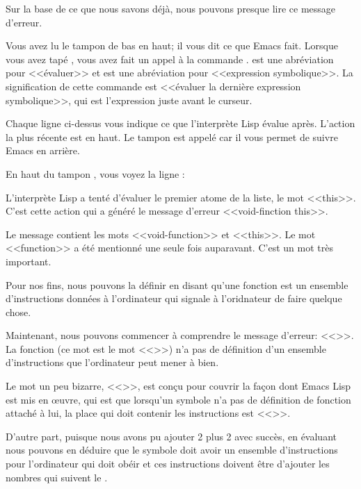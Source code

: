Sur la base de ce que nous savons déjà, nous pouvons presque lire ce
message d'erreur.

Vous avez lu le tampon  de bas en haut; il vous dit ce
que Emacs fait. Lorsque vous avez tapé , vous avez
fait un appel à la commande .  est une
abréviation pour <<évaluer>> et  est une abréviation pour
<<expression symbolique>>. La signification de cette commande est
<<évaluer la dernière expression symbolique>>, qui est l'expression
juste avant le curseur.

Chaque ligne ci-dessus vous indique ce que l'interprète Lisp évalue
après. L'action la plus récente est en haut. Le tampon est appelé
 car il vous permet de suivre Emacs en arrière.

En haut du tampon , vous voyez la ligne :
\begin{center}
\end{center}

L'interprète Lisp a tenté d'évaluer le premier atome de la liste, le
mot <<this>>. C'est cette action qui a généré le message d'erreur
<<void-finction this>>. 

Le message contient les mots <<void-function>> et <<this>>. Le mot
<<function>> a été mentionné une seule fois auparavant. C'est un mot
très important.

Pour nos fins, nous pouvons la définir en disant qu'une fonction est
un ensemble d'instructions données à l'ordinateur qui signale à
l'oridnateur de faire quelque chose. 

Maintenant, nous pouvons commencer à comprendre le message d'erreur:
<<>>. La fonction (ce mot est le mot
<<>>) n'a pas de définition d'un ensemble d'instructions que
l'ordinateur peut mener à bien. 

Le mot un peu bizarre, <<>>, est conçu pour couvrir
la façon dont Emacs Lisp est mis en \oe{}uvre, qui est que lorsqu'un
symbole n'a pas de définition de fonction attaché à lui, la place qui
doit contenir les instructions est <<>>.

D'autre part, puisque nous avons pu ajouter 2 plus 2 avec succès, en
évaluant  nous pouvons en déduire que le symbole \tm{+}
doit avoir un ensemble d'instructions pour l'ordinateur qui doit obéir
et ces instructions doivent être d'ajouter les nombres qui suivent le
\tm{+}.

